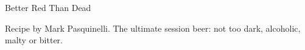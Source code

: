 \begin{recipe}{Better Red Than Dead}

\begin{aboutblock}
Recipe by Mark Pasquinelli. The ultimate session beer: not too dark, alcoholic,
malty or bitter.  
\end{aboutblock}


\begin{methodandtiming}

\begin{mashsteps}
\end{mashsteps}

\begin{fermentationsteps}
\end{fermentationsteps}

\end{methodandtiming}

\recipebreak

\begin{ingredientsblock}

\begin{malts}
\end{malts}

\begin{hops}
\end{hops}


\end{ingredientsblock}

\end{recipe}

